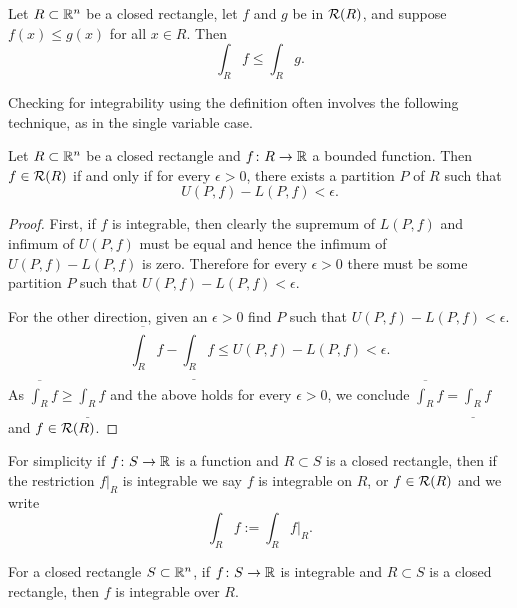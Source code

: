 \begin{prop}[Monotonicity]
Let $R \subset {\mathbb{R}}^n$ be a closed rectangle, let
$f$ and $g$ be in ${\mathcal{R}}(R)$, and suppose $f(x) \leq g(x)$
for all $x \in R$.  Then
\begin{equation*}
\int_R f 
\leq
\int_R g .
\end{equation*}
\end{prop}

Checking for integrability using the definition often involves the following
technique, as in the single variable case.

\begin{prop} \label{mv:prop:upperlowerepsilon}
Let $R \subset {\mathbb{R}}^n$ be a closed rectangle and
$f \colon R \to {\mathbb{R}}$ a bounded function.
Then $f \in {\mathcal{R}}(R)$ if and only if
for every $\epsilon > 0$, there exists a partition $P$ of $R$
such that
\begin{equation*}
U(P,f) - L(P,f) < \epsilon .
\end{equation*}
\end{prop}

\begin{proof}
First, if $f$ is integrable, then clearly the supremum of $L(P,f)$ and
infimum of $U(P,f)$ must be equal and hence the
infimum of $U(P,f)-L(P,f)$ is zero.  Therefore for
every $\epsilon > 0$ there must be some partition $P$ such that 
$U(P,f) - L(P,f) < \epsilon$.

For the other direction, given an $\epsilon > 0$ find $P$ such that
$U(P,f) - L(P,f) < \epsilon$.
\begin{equation*}
\overline{\int_R} f - 
\underline{\int_R} f 
\leq
U(P,f) - L(P,f)
< \epsilon .
\end{equation*}
As $\overline{\int_R} f \geq \underline{\int_R} f$ and the above holds for
every $\epsilon > 0$, we conclude 
$\overline{\int_R} f = \underline{\int_R} f$ and $f \in {\mathcal{R}}(R)$.
\end{proof}

For simplicity if $f \colon S \to {\mathbb{R}}$ is a function and $R \subset S$
is a closed rectangle, then if the restriction $f|_R$ is integrable we
say $f$ is integrable on $R$, or $f \in {\mathcal{R}}(R)$ and we
write
\begin{equation*}
\int_R f := \int_R f|_R .
\end{equation*}

\begin{prop} \label{mv:prop:integralsmallerset}
For a closed rectangle $S \subset {\mathbb{R}}^n$,
if $f \colon S \to {\mathbb{R}}$ is integrable and $R \subset S$
is a closed rectangle, then $f$ is integrable over $R$.
\end{prop}

